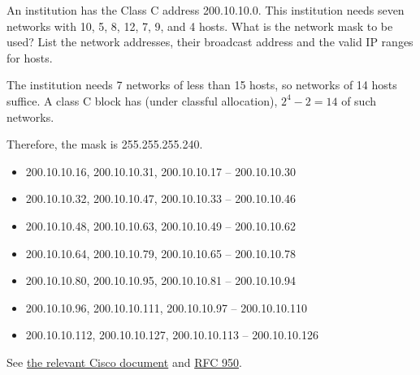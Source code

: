 \begin{Exercise}
\end{Exercise}

\begin{Exercise}
\end{Exercise}

\begin{Exercise}
An institution has the Class C address 200.10.10.0.
This institution needs seven networks with 10, 5, 8, 12, 7, 9, and 4 hosts.
What is the network mask to be used?
List the network addresses, their broadcast address and the valid IP ranges for hosts.
\end{Exercise}
\begin{Answer}
The institution needs 7 networks of less than 15 hosts, so networks of 14 hosts suffice. A class C block has (under classful allocation), \(2^{4} - 2 = 14\) of such networks.

Therefore, the mask is 255.255.255.240.

\begin{itemize}
\item 200.10.10.16, 200.10.10.31, 200.10.10.17 -- 200.10.10.30
\item 200.10.10.32, 200.10.10.47, 200.10.10.33 -- 200.10.10.46
\item 200.10.10.48, 200.10.10.63, 200.10.10.49 -- 200.10.10.62
\item 200.10.10.64, 200.10.10.79, 200.10.10.65 -- 200.10.10.78
\item 200.10.10.80, 200.10.10.95, 200.10.10.81 -- 200.10.10.94
\item 200.10.10.96, 200.10.10.111, 200.10.10.97 -- 200.10.10.110
\item 200.10.10.112, 200.10.10.127, 200.10.10.113 -- 200.10.10.126
\end{itemize}

See \href{https://www.cisco.com/c/en/us/support/docs/ip/dynamic-address-allocation-resolution/13711-40.html}{the relevant Cisco document} and \href{https://tools.ietf.org/html/rfc950}{RFC 950}.
\end{Answer}

